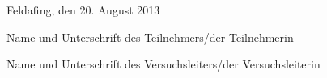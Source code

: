 \documentclass{article}
\begin{document}
\vspace{1cm}

Feldafing, den 20. August 2013
%



\vspace{1cm}
Name und Unterschrift des Teilnehmers/der Teilnehmerin

\vspace{1cm}
\underline{\hspace{4cm}} \hspace{0.5cm} \underline{\hspace{4cm}}

\vspace{0.5cm}
Name und Unterschrift des Versuchsleiters/der Versuchsleiterin



\vspace{1cm}
\underline{\hspace{4cm}} \hspace{0.5cm} \underline{\hspace{4cm}}
\end{document}
